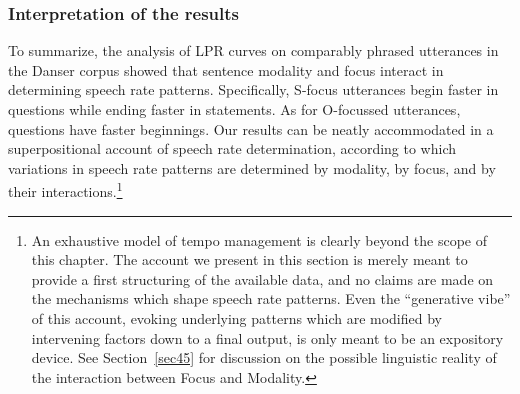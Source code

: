 \subsubsection{Interpretation of the results}\label{sec4442}
To summarize, the analysis of LPR curves on comparably phrased utterances in the Danser corpus showed that sentence modality and focus interact in determining speech rate patterns. Specifically, S-focus utterances begin faster in questions while ending faster in statements. As for O-focussed utterances, questions have faster beginnings. Our results can be neatly accommodated in a superpositional account of speech rate determination, according to which variations in speech rate patterns are determined by modality, by focus, and by their interactions.\footnote{An exhaustive model of tempo management is clearly beyond the scope of this chapter. The account we present in this section is merely meant to provide a first structuring of the available data, and no claims are made on the mechanisms which shape speech rate patterns. Even the ``generative vibe'' of this account, evoking underlying patterns which are modified by intervening factors down to a final output, is only meant to be an expository device. See Section~\ref{sec45} for discussion on the possible linguistic reality of the interaction between Focus and Modality.} 

